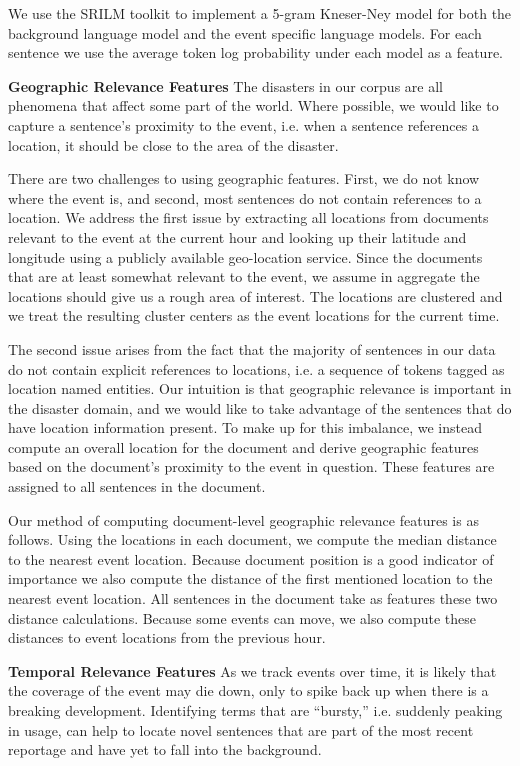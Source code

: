 We use the SRILM toolkit \cite{stolcke2002srilm} to implement a 5-gram 
Kneser-Ney model for both the background language model and the event specific
language models. For each sentence we use the average token log probability 
under each model as a feature.


\textbf{Geographic Relevance Features}
The disasters in our corpus are all phenomena that affect some part of the 
world. Where possible, we would like to capture a sentence's proximity to the 
event, i.e. when a sentence references a location, it should be close to the 
area of the disaster. 


There are two challenges to using geographic features. First, we do not know 
where the event is, and second, most sentences do not contain references to a 
location. We address the first issue by extracting all locations from 
documents relevant to the event at the current hour and looking up their 
latitude and longitude using a publicly available geo-location service. 
Since the documents that are at least somewhat relevant to the event, we 
assume in aggregate the locations should give us a rough area of interest.
The locations are clustered and we treat the resulting cluster centers as the 
event locations for the current time.


The second issue arises from the fact that the majority of sentences in our 
data do not contain explicit references to locations, i.e. a sequence of 
tokens tagged as location named entities. Our intuition is that geographic 
relevance is important in the disaster domain, and we would like to take 
advantage of the sentences that do have location information present. To make 
up for this imbalance, we instead compute an overall location for the document
and derive geographic features based on the document's proximity to the event
in question. These features are assigned to all sentences in the document.


Our method of computing document-level geographic relevance features is as 
follows. Using the locations in each document, we compute the median distance 
to the nearest event location. Because document position is a good indicator 
of importance we also compute the distance of the first mentioned location to 
the nearest event location. All sentences in the document take as features 
these two distance calculations. Because some events can move, we also compute
these distances to event locations from the previous hour.


\textbf{Temporal Relevance Features}
As we track events over time, it is likely that the coverage of the event 
may die down, only to spike back up when there is a breaking development.
Identifying terms that are ``bursty,'' i.e. suddenly peaking in usage,
can help to locate novel sentences that are part of the most recent reportage
and have yet to fall into the background.

